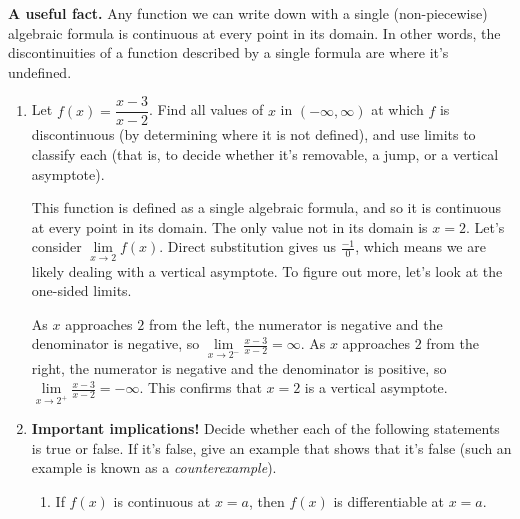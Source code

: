 \documentclass[main]{subfiles}
\begin{document}
\begin{framed}
 \textbf{A useful fact.} Any function we can write down with a single (non-piecewise) algebraic formula is continuous at every point in its domain. In other words, the discontinuities of a function described by a single formula are where it's undefined.
 \end{framed}
\begin{enumerate}[resume]
\item 
  \begin{problem}[\vfill]
    Let $f(x) = \dfrac{x - 3}{x - 2}$. Find all values of $x$ in $(-\infty, \infty)$ at which $f$ is discontinuous (by determining where it is not defined), and use limits to classify each (that is, to decide whether it's removable, a jump, or a vertical asymptote). 
  \end{problem}

  \begin{solution}
    This function is defined as a single algebraic formula, and so it is continuous
    at every point in its domain. The only value not in its domain is $x=2$. Let's
    consider $\lim\limits_{x \to 2} f(x)$. Direct substitution gives us $\frac{-1}{0}$, 
    which means we are likely dealing with a vertical asymptote. To figure out more, let's
    look at the one-sided limits.

    As $x$ approaches $2$ from the left, the numerator is negative and the denominator is
    negative, so $\lim\limits_{x \to 2^-} \frac{x-3}{x-2} = \infty.$ As $x$ approaches $2$
    from the right, the numerator is negative and the denominator is
    positive, so $\lim\limits_{x \to 2^+} \frac{x-3}{x-2} = -\infty.$ This confirms
    that $x=2$ is a vertical asymptote.
  \end{solution}



  

  \pspace{\newpage}

\item  \label{continuity-differentiability-relationship}

  \textbf{Important implications!} Decide whether each of the following statements is true or false. If it's false, give an example that shows that it's false (such an example is known as a \textit{counterexample}). 
  \begin{enumerate}
  \item
    \begin{problem}[1in]
      If $f(x)$ is continuous at $x = a$, then $f(x)$ is differentiable at $x = a$.
    \end{problem}


\end{enumerate}
\end{enumerate}
\end{document}

